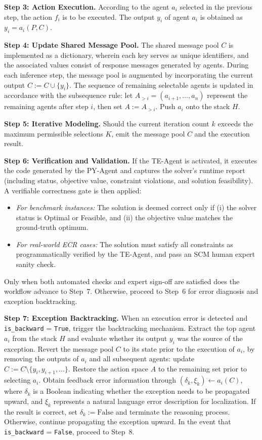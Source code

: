 \documentclass[preprint,12pt]{elsarticle}
\begin{document}
\medskip
\noindent\textbf{Step 3: Action Execution.}
According to the agent $a_i$ selected in the previous step, the action $f_i$ is to be executed. The output $y_i$ of agent $a_i$ is obtained as $y_i=a_i\left(P,C\right)$.

\medskip
\noindent\textbf{Step 4: Update Shared Message Pool.}
The shared message pool $C$ is implemented as a dictionary, wherein each key serves as unique identifiers, and the associated values consist of response messages generated by agents. During each inference step, the message pool is augmented by incorporating the current output $C:= C\cup\{y_i\}$. The sequence of remaining selectable agents is updated in accordance with the subsequence rule: let $A_{>i}=\left(a_{i+1},\ldots,a_n\right)$ represent the remaining agents after step $i$, then set $A:= A_{>i}$. Push $a_i$ onto the stack $H$.

\medskip
\noindent\textbf{Step 5: Iterative Modeling.}
Should the current iteration count $k$ exceeds the maximum permissible selections $K$, emit the message pool $C$ and the execution result.

\medskip
\noindent\textbf{Step 6: Verification and Validation.}
If the TE-Agent is activated, it executes the code generated by the PY-Agent and captures the solver's runtime report (including status, objective value, constraint violations, and solution feasibility). A verifiable correctness gate is then applied:
\begin{itemize}
    \item \textit{For benchmark instances:} The solution is deemed correct only if (i) the solver status is Optimal or Feasible, and (ii) the objective value matches the ground-truth optimum.
    \item \textit{For real-world ECR cases:} The solution must satisfy all constraints as programmatically verified by the TE-Agent, and pass an SCM human expert sanity check.
\end{itemize}
Only when both automated checks and expert sign-off are satisfied does the workflow advance to Step~7. Otherwise, proceed to Step~6 for error diagnosis and exception backtracking.

\medskip
\noindent\textbf{Step 7: Exception Backtracking.}
When an execution error is detected and \texttt{is\_backward} = \texttt{True}, trigger the backtracking mechanism. Extract the top agent $a_i$ from the stack $H$ and evaluate whether its output $y_i$ was the source of the exception. Revert the message pool $C$ to its state prior to the execution of $a_i$, by removing the outputs of $a_i$ and all subsequent agents: update $C:= C\setminus\{y_i,y_{i+1},\ldots\}$. Restore the action space $A$ to the remaining set prior to selecting $a_i$. Obtain feedback error information through $\left(\delta_k,\xi_k\right)\gets a_i\left(C\right)$, where $\delta_k$ is a Boolean indicating whether the exception needs to be propagated upward, and $\xi_k$ represents a natural language error description for localization. If the result is correct, set $\delta_k:= \mathrm{False}$ and terminate the reasoning process. Otherwise, continue propagating the exception upward. In the event that \texttt{is\_backward} = \texttt{False}, proceed to Step~8.
\end{document}
